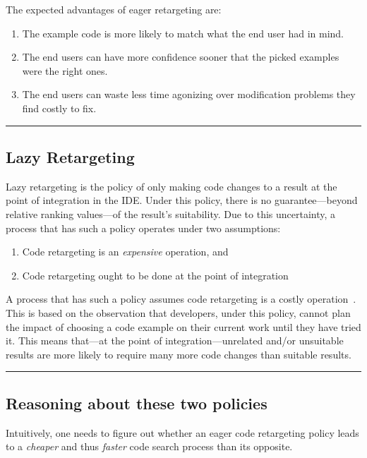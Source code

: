 The expected advantages of eager retargeting are:

\begin{enumerate}
	\item The example code is more likely to match what the end user had in mind.
	\item The end users can have more confidence sooner that the picked examples were the right ones.
	\item The end users can waste less time agonizing over modification problems they find costly to fix. 
\end{enumerate}


\fancybreak{\pfbreakdisplay}

\subsection{Lazy Retargeting}

Lazy retargeting is the policy of only making code changes to a result at the point of integration in the IDE. Under this policy, there is no guarantee---beyond relative ranking values---of the result's suitability. Due to this uncertainty, a process that has such a policy operates under two assumptions:

\begin{enumerate}
	\item Code retargeting is an \emph{expensive} operation, and
	\item Code retargeting ought to be done at the point of integration
\end{enumerate}

A process that has such a policy assumes code retargeting is a costly operation~\cite{Brandt:2009ew, Wightman:2012gc}. This is based on the observation that developers, under this policy, cannot plan the impact of choosing a code example on their current work until they have tried it. This means that---at the point of integration---unrelated and/or unsuitable results are more likely to require many more code changes than suitable results.

\fancybreak{\pfbreakdisplay}

\subsection{Reasoning about these two policies}

Intuitively, one needs to figure out whether an eager code retargeting policy leads to a \emph{cheaper} and thus \emph{faster} code search process than its opposite. 

